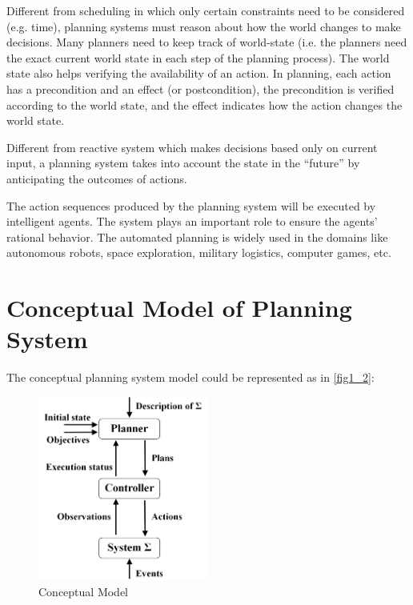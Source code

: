 Different from scheduling in which only certain constraints need to be considered (e.g. time), planning systems must reason about how the world changes to make decisions. Many planners need to keep track of world-state (i.e. the planners need the exact current world state in each step of the planning process). The world state also helps verifying the availability of an action. In planning, each action has a precondition and an effect (or postcondition), the precondition is verified according to the world state, and the effect indicates how the action changes the world state.

Different from reactive system which makes decisions based only on current input, a planning system takes into account the state in the “future” by anticipating the outcomes of actions. 

The action sequences produced by the planning system will be executed by intelligent agents. The system plays an important role to ensure the agents’ rational behavior. The automated planning is widely used in the domains like autonomous robots, space exploration, military logistics, computer games, etc.

\section{Conceptual Model of Planning System}
\label{planningModel}
The conceptual planning system model could be represented as in \autoref{fig1_2}:

\begin{figure}[H]
    \center
    \includegraphics[width=0.5\textwidth]{./images/1_2.png}
    \caption{Conceptual Model}
    \label{fig1_2}
\end{figure}

